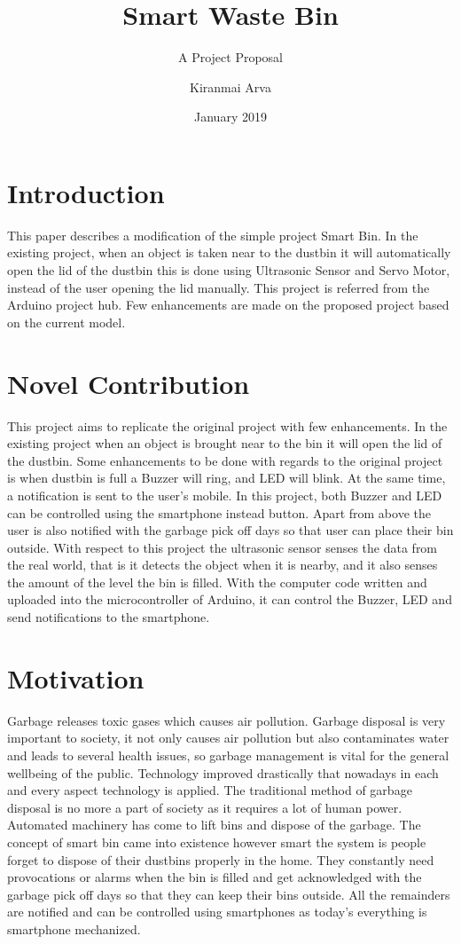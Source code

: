 \documentclass[11pt]{extarticle}
\title{Smart Waste Bin}
\author{A Project Proposal}
\date{January 2019}
\author{Kiranmai Arva}
\begin{document}
\maketitle
\section*{Introduction}

This paper describes a modification of the simple project Smart Bin. In the existing project, when an object is taken near to the dustbin it will automatically open the lid of the dustbin this is done using Ultrasonic Sensor and Servo Motor, instead of the user opening the lid manually. This project is referred from the Arduino project hub. Few enhancements are made on the proposed project based on the current model.
\section*{Novel Contribution}
This project aims to replicate the original project with few enhancements. In the existing project when an object is brought near to the bin it will open the lid of the dustbin. Some enhancements to be done with regards to the original project is when dustbin is full a Buzzer will ring, and LED will blink. At the same time, a notification is sent to the user’s mobile. In this project, both Buzzer and LED can be controlled using the smartphone instead button. Apart from above the user is also notified with the garbage pick off days so that user can place their bin outside. With respect to this project the ultrasonic sensor senses the data from the real world, that is it detects the object when it is nearby, and it also senses the amount of the level the bin is filled. With the computer code written and uploaded into the microcontroller of Arduino, it can control the Buzzer, LED and send notifications to the smartphone.

\section*{Motivation}
Garbage releases toxic gases which causes air pollution. Garbage disposal is very important to society, it not only causes air pollution but also contaminates water and leads to several health issues, so garbage management is vital for the general wellbeing of the public. Technology improved drastically that nowadays in each and every aspect technology is applied. The traditional method of garbage disposal is no more a part of society as it requires a lot of human power. Automated machinery has come to lift bins and dispose of the garbage. The concept of smart bin came into existence however smart the system is people forget to dispose of their dustbins properly in the home. They constantly need provocations or alarms when the bin is filled and get acknowledged with the garbage pick off days so that they can keep their bins outside. All the remainders are notified and can be controlled using smartphones as today's everything is smartphone mechanized.
\end{document}
